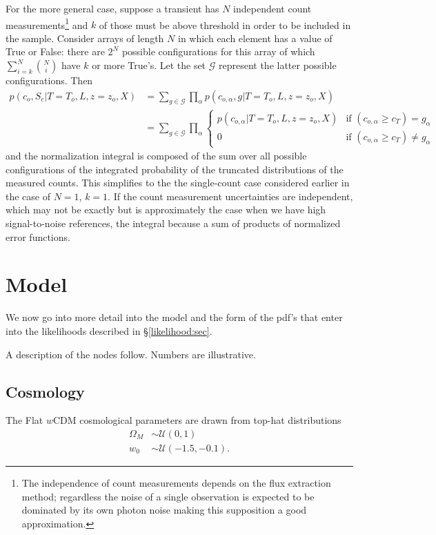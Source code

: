 \documentclass[preprint,3p]{elsarticle}
\begin{document}
For the more general case, suppose a transient has $N$ independent count measurements\footnote{The independence of count measurements  depends on the flux extraction method; regardless the
noise of a single observation is expected to be dominated by its own photon noise making this
supposition a good approximation.} and $k$ of those must be above threshold in order to be
included in the sample.
Consider arrays of length $N$ in which each element has a value of True or False: there are $2^N$ possible configurations for this array
of which $\sum_{i=k}^N {N \choose i}$ have $k$ or more True's.  Let the set $\mathcal{G}$ represent the latter possible configurations.
Then
\begin{align}
p(c_o, S_c| T=T_o, L, z=z_o, X) &= \sum_{g \in \mathcal{G}} \prod_{\alpha} p(c_{o, \alpha}, g | T=T_o, L, z=z_o, X)\\
 &=  \sum_{g \in \mathcal{G}}  \prod_{\alpha} \begin{cases}
   p(c_{o,\alpha} | T=T_o, L, z=z_o, X) & \text{if } (c_{o,\alpha} \ge c_T) = g_\alpha\\
   0 & \text{if }  (c_{o,\alpha} \ge c_T)  \ne g_\alpha
 \end{cases}
\end{align}
and the normalization integral is composed of the sum over all possible configurations of the integrated probability of the truncated distributions
of the measured counts.  This simplifies to the the single-count case considered earlier in the case of $N=1$, $k=1$.
If the count measurement uncertainties are independent, which may not be exactly but is approximately the case when we have high
signal-to-noise references, the integral because a sum of products of normalized error functions.



\section{Model}
\label{model:sec}

We now go into more detail into the model and the form of the pdf's that enter
into the likelihoods described in \S\ref{likelihood:sec}.

A description of the nodes follow.  Numbers are illustrative. 

\subsection{Cosmology}
The Flat $w$CDM cosmological parameters are drawn from top-hat distributions
\begin{align}
\Omega_M & \sim  {\mathcal{U}}(0,1)\\
w_0 & \sim \mathcal{U}(-1.5, -0.1).
\end{align}
\end{document}
